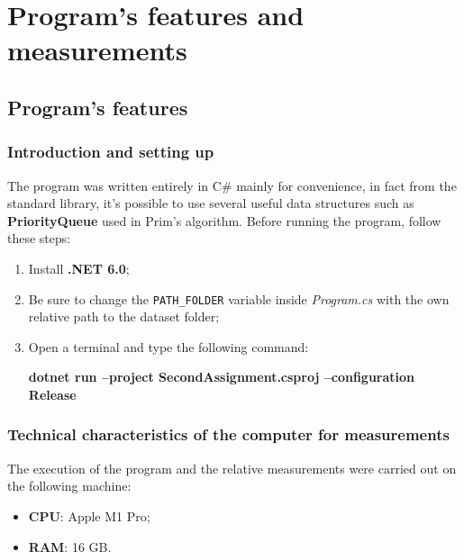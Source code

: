 \section{Program's features and measurements}

\subsection{Program's features}

\subsubsection{Introduction and setting up}
The program was written entirely in C\# mainly for convenience, in fact from the standard library, it's possible to 
use several useful data structures such as \textbf{PriorityQueue} used in Prim's algorithm.
Before running the program, follow these steps:
\begin{enumerate}
    \item Install \textbf{.NET 6.0};
    \item Be sure to change the \verb|PATH_FOLDER| variable inside \textit{Program.cs} with the own relative path to the dataset folder;
    \item Open a terminal and type the following command:\\
        \centerline{\textbf{dotnet run --project SecondAssignment.csproj --configuration Release}}
\end{enumerate}

\subsubsection{Technical characteristics of the computer for measurements}
The execution of the program and the relative measurements were carried out on the following machine:
\begin{itemize}
    \item \textbf{CPU}: Apple M1 Pro;
    \item \textbf{RAM}: 16 GB.
\end{itemize}

